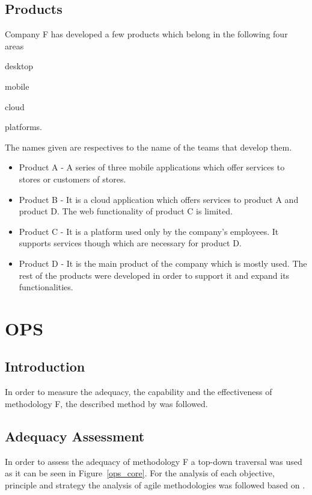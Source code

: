 
\subsection{Products}
Company F has developed a few products which belong in the following four areas 
\begin{inparaenum} [a\upshape)]
\item desktop
\item mobile
\item cloud
\item platforms.
\end{inparaenum}
The names given are respectives to the name of the teams that develop them.

\begin{itemize}
\item Product A - A series of three mobile applications which offer services to stores or customers of stores.
\item Product B - It is a cloud application which offers services to product A and product D. The web functionality of product C is limited.
\item Product C - It is a platform used only by the company's employees. It supports services though which are necessary for product D.
\item Product D - It is the main product of the company which is mostly used. The rest of the products were developed in order to support it and expand its functionalities.

\end{itemize}

\section{OPS}

\subsection{Introduction}
In order to measure the adequacy, the capability and the effectiveness of methodology F, the described method by \citet{sventha_dissertation} was followed.

\subsection{Adequacy Assessment}
\label{subsec:adequacy_analysis}

In order to assess the adequacy of methodology F a top-down traversal was used as it can be seen in Figure~\ref{ops_core}. For the analysis of each objective, principle and strategy the analysis of agile methodologies was followed based on \citet{koch2005agile}.

